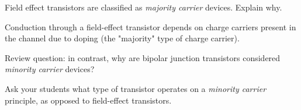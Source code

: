 

Field effect transistors are classified as {\it majority carrier} devices.  Explain why.







Conduction through a field-effect transistor depends on charge carriers present in the channel due to doping (the "majority" type of charge carrier).

\vskip 10pt

Review question: in contrast, why are bipolar junction transistors considered {\it minority carrier} devices?







Ask your students what type of transistor operates on a {\it minority carrier} principle, as opposed to field-effect transistors.




